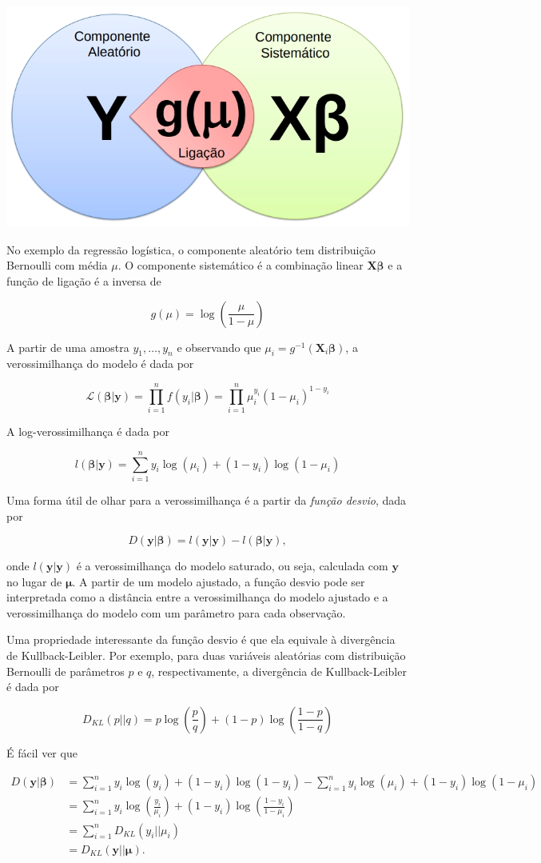 \documentclass[12pt,]{report}
\begin{document}
\begin{center}\includegraphics[width=0.4\linewidth]{assets/img/glm} \end{center}

No exemplo da regressão logística, o componente aleatório tem distribuição Bernoulli com média \(\mu\). O componente sistemático é a combinação linear \(\mathbf X \boldsymbol \beta\) e a função de ligação é a inversa de

\[
g(\mu) = \log\left(\frac{\mu}{1-\mu}\right)
\]

A partir de uma amostra \(y_1, \dots, y_n\) e observando que \(\mu_i = g^{-1}(\mathbf X_i\boldsymbol\beta)\), a verossimilhança do modelo é dada por

\[
\mathcal L(\boldsymbol \beta|\mathbf y) = \prod_{i=1}^n f(y_i|\boldsymbol\beta) = \prod_{i=1}^n\mu_i^{y_i}(1-\mu_i)^{1-y_i}
\]

A log-verossimilhança é dada por

\[
l(\boldsymbol \beta|\mathbf y) = \sum_{i=1}^n y_i\log(\mu_i) + (1-y_i)\log(1-\mu_i)
\]

Uma forma útil de olhar para a verossimilhança é a partir da \emph{função desvio}, dada por

\[
D(\mathbf y|\boldsymbol \beta) = l(\mathbf y|\mathbf y) - l(\boldsymbol \beta|\mathbf y),
\]

onde \(l(\mathbf y|\mathbf y)\) é a verossimilhança do modelo saturado, ou seja, calculada com \(\mathbf y\) no lugar de \(\boldsymbol \mu\). A partir de um modelo ajustado, a função desvio pode ser interpretada como a distância entre a verossimilhança do modelo ajustado e a verossimilhança do modelo com um parâmetro para cada observação.

Uma propriedade interessante da função desvio é que ela equivale à divergência de Kullback-Leibler. Por exemplo, para duas variáveis aleatórias com distribuição Bernoulli de parâmetros \(p\) e \(q\), respectivamente, a divergência de Kullback-Leibler é dada por

\[
D_{KL}(p||q) = p\log\left(\frac p q\right) + (1-p)\log\left(\frac{1-p}{1-q}\right)
\]

É fácil ver que

\[
\begin{aligned}
D(\mathbf y|{ \boldsymbol \beta}) &= \sum_{i=1}^n y_i\log(y_i) + (1-y_i)\log(1-y_i) - \sum_{i=1}^n y_i\log(\mu_i) + (1-y_i)\log(1-\mu_i) \\
&=\sum_{i=1}^ny_i\log\left(\frac{y_i}{\mu_i}\right) + (1-y_i)\log\left(\frac{1-y_i}{1-\mu_i}\right) \\
&= \sum_{i=1}^n D_{KL}(y_i||\mu_i) \\
&= D_{KL}(\mathbf y||{\boldsymbol\mu}).
\end{aligned}
\]
\end{document}
